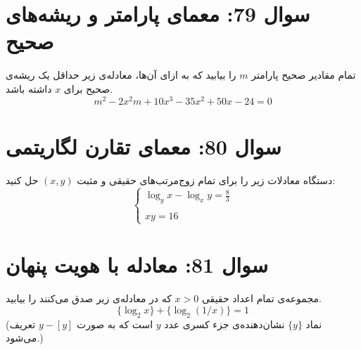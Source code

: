 \documentclass[12pt]{article}
\begin{document}
\section*{سوال 79: معمای پارامتر و ریشه‌های صحیح}
تمام مقادیر صحیح پارامتر \(m\) را بیابید که به ازای آن‌ها، معادله‌ی زیر حداقل یک ریشه‌ی صحیح برای \(x\) داشته باشد.
\begin{displaymath}
	m^2 - 2x^2m + 10x^3 - 35x^2 + 50x - 24 = 0
\end{displaymath}

\vspace{1cm}
\hrulefill
\vspace{1cm}

\section*{سوال 80: معمای تقارن لگاریتمی}
دستگاه معادلات زیر را برای تمام زوج‌مرتب‌های حقیقی و مثبت \((x, y)\) حل کنید:
\begin{displaymath}
	\begin{cases}
		\log_y x - \log_x y = \frac{8}{3} \\
		\\
		xy = 16
	\end{cases}
\end{displaymath}


\vspace{1cm}
\hrulefill
\vspace{1cm}

\section*{سوال 81: معادله با هویت پنهان}
مجموعه‌ی تمام اعداد حقیقی \(x > 0\) که در معادله‌ی زیر صدق می‌کنند را بیابید.
\begin{displaymath}
	\{\log_2 x\} + \{\log_2 (1/x)\} = 1
\end{displaymath}
(نماد \( \{y\} \) نشان‌دهنده‌ی جزء کسری عدد \(y\) است که به صورت \( y - [y] \) تعریف می‌شود.)
\end{document}
